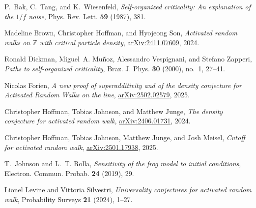 \documentclass[ECP]{ejpecp} %
\begin{document}

%
%

\newcommand{\arxivurl}[1]{\href{https://arXiv.org/abs/#1}{arXiv:#1}}
\begin{thebibliography}{}
P.~Bak, C.~Tang, and K.~Wiesenfeld,
\emph{Self-organized criticality: An explanation of the $1/f$ noise}, Phys.
Rev. Lett. \textbf{59} (1987), 381.

Madeline Brown, Christopher Hoffman, and Hyojeong Son,
\emph{Activated random walks on {$\mathbb{Z}$} with critical particle density},
\arxivurl{2411.07609}, 2024.

Ronald Dickman, Miguel~A. Mu{\~n}oz, Alessandro Vespignani, and Stefano
Zapperi, \emph{Paths to self-organized criticality}, Braz. J. Phys.
\textbf{30} (2000), no.~1, 27--41.

Nicolas Forien,
\emph{A new proof of superadditivity and of the density conjecture for {A}ctivated
{R}andom {W}alks on the line}, \arxivurl{2502.02579}, 2025.

Christopher Hoffman, Tobias Johnson, and Matthew Junge,
\emph{The density conjecture for activated random walk}, \arxivurl{2406.01731},
2024.

Christopher Hoffman, Tobias Johnson, Matthew Junge, and Josh Meisel,
\emph{Cutoff for activated random walk}, \arxivurl{2501.17938}, 2025.

T.~Johnson and L.~T. Rolla,
\emph{Sensitivity of the frog model to initial conditions}, Electron. Commun.
Probab. \textbf{24} (2019), 29.

Lionel Levine and Vittoria Silvestri,
\emph{{Universality conjectures for activated random walk}}, Probability
Surveys \textbf{21} (2024), 1--27.


\end{thebibliography}
\end{document}
